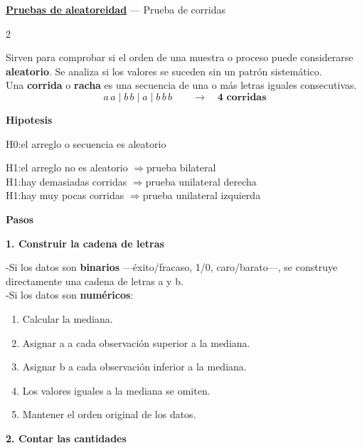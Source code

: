 \documentclass[12pt,a4paper,landscape]{article}
\newenvironment{sangria}{\begin{list}{}{\setlength{\leftmargin}{16pt}\setlength{\rightmargin}{0pt}\setlength{\itemindent}{0pt}\setlength{\listparindent}{0pt}\setlength{\topsep}{2pt}\setlength{\parsep}{4pt}}\item[]}{\end{list}}
\begin{document}
\begin{center}
{\fontsize{17}{21}\selectfont\bfseries\uline{Pruebas de aleatoreidad}} \quad --- Prueba de corridas
\end{center}

\vspace{2pt}

\begin{multicols}{2}

Sirven para comprobar si el orden de una muestra o proceso puede considerarse \textbf{aleatorio}. Se analiza si los valores se suceden sin un patrón sistemático.\\
Una \textbf{corrida} o \textbf{racha} es una secuencia de una o más letras iguales consecutivas.
\[
a\,a \mid b\,b \mid a \mid b\,b\,b \qquad \longrightarrow \quad \textbf{4 corridas}
\]

{\fontsize{15}{18}\selectfont\bfseries Hipotesis}

H0:el arreglo o secuencia es aleatorio

H1:el arreglo no es aleatorio $\Rightarrow$prueba bilateral\\
H1:hay demasiadas corridas $\Rightarrow$prueba unilateral derecha\\
H1:hay muy pocas corridas $\Rightarrow$prueba unilateral izquierda

{\fontsize{15}{18}\selectfont\bfseries Pasos}

\textbf{1. Construir la cadena de letras}

\begin{sangria}
-Si los datos son \textbf{binarios} ---éxito/fracaso, 1/0, caro/barato---, se construye directamente una cadena de letras a y b.\\
-Si los datos son \textbf{numéricos}:
\begin{enumerate}[leftmargin=20pt,itemsep=2pt,topsep=3pt,parsep=0pt]
  \item Calcular la mediana.
  \item Asignar a a cada observación superior a la mediana.
  \item Asignar b a cada observación inferior a la mediana.
  \item Los valores iguales a la mediana se omiten.
  \item Mantener el orden original de los datos.
\end{enumerate}
\end{sangria}

\begin{minipage}{\linewidth}
\textbf{2. Contar las cantidades}


\end{minipage}
\end{multicols}
\end{document}
